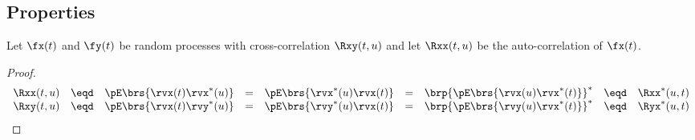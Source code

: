 \subsection{Properties}

\begin{theorem}
\label{thm:Rxx_prop}
Let $\fx(t)$ and $\fy(t)$ be random processes with
cross-correlation $\Rxy(t,u)$ and
let $\Rxx(t,u)$ be the auto-correlation of $\fx(t)$.
\end{theorem}

\begin{proof}
\[\begin{array}{*{12}{l}}
   \Rxx(t,u)
      &\eqd& \pE\brs{\rvx(t) \rvx^\ast(u)}
      &=&      \pE\brs{\rvx^\ast(u) \rvx(t)}
      &=&      \brp{ \pE\brs{\rvx(u) \rvx^\ast(t)}}^\ast
      &\eqd& \Rxx^\ast(u,t)
\\
   \Rxy(t,u)
      &\eqd& \pE\brs{\rvx(t) \rvy^\ast(u)}
      &=&      \pE\brs{\rvy^\ast(u) \rvx(t) }
      &=&      \brp{\pE\brs{\rvy(u) \rvx^\ast(t)}}^\ast
      &\eqd& \Ryx^\ast(u,t)
\end{array}\]
\end{proof}


